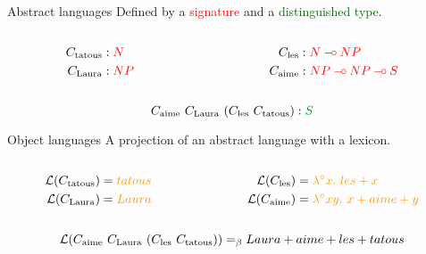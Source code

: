 \documentclass{beamer}
\def\limp {\mathbin{{-}\mkern-3.5mu{\circ}}}
\begin{document}
\begin{frame}
  \begin{block}{Abstract languages}
    Defined by a \textcolor{red}{signature} and a
    \textcolor{darkgreen}{distinguished type}.

    \begin{columns}[t]
      \begin{column}{0.5\textwidth}
        \begin{align*}
          C_{\textrm{tatous}} &: \textcolor{red}{N} \\
          C_{\textrm{Laura}} &: \textcolor{red}{NP}
        \end{align*}
      \end{column}
      \begin{column}{0.5\textwidth}
        \begin{align*}
          \synt{les} &: \textcolor{red}{N \limp NP} \\
          \synt{aime} &: \textcolor{red}{NP \limp NP \limp S}
        \end{align*}
      \end{column}
    \end{columns}

    $$\synt{aime}\ \synt{Laura}\ (\synt{les}\ \synt{tatous}) :
    \textcolor{darkgreen}{S}$$
  \end{block}

  \begin{block}{Object languages}
    A projection of an abstract language with a \textcolor{darkgold}{lexicon}.

    \begin{columns}[t]
      \begin{column}{0.5\textwidth}
        \begin{align*}
          \mathcal{L}(\synt{tatous}) &= \textcolor{darkgold}{tatous} \\
          \mathcal{L}(\synt{Laura}) &= \textcolor{darkgold}{Laura}
        \end{align*}
      \end{column}
      \begin{column}{0.5\textwidth}
        \begin{align*}
          \mathcal{L}(\synt{les}) &= \textcolor{darkgold}{\lambda^{\circ} x.\ les + x} \\
          \mathcal{L}(\synt{aime}) &= \textcolor{darkgold}{\lambda^{\circ} x y.\ x + aime + y}
        \end{align*}
      \end{column}
    \end{columns}

    $$\mathcal{L}(\synt{aime}\ \synt{Laura}\ (\synt{les}\ \synt{tatous}))
    =_{\beta} Laura + aime + les + tatous$$
  \end{block}
\end{frame}
\end{document}
